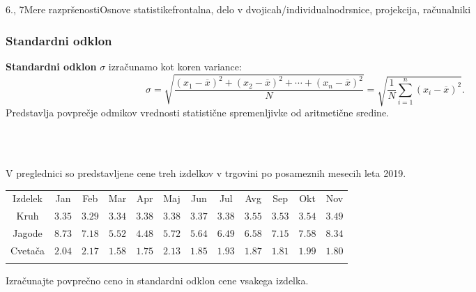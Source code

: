 \begin{priprava}{6., 7}{}{Mere razpršenosti}{Osnove statistike}{frontalna, delo v dvojicah/individualno}{drsnice, projekcija, računalniki}
% 
% 

\subsubsection{Standardni odklon}
    \textbf{Standardni odklon} $\sigma$ izračunamo kot koren variance:
    $$\sigma=\sqrt{\dfrac{(x_1-\overline{x})^2+(x_2-\overline{x})^2+\cdots+(x_n-\overline{x})^2}{N}}=\sqrt{\dfrac{1}{N}\sum_{i=1}^n(x_i-\overline{x})^2}.$$
    Predstavlja povprečje odmikov vrednosti statistične spremenljivke od aritmetične sredine.


~\\~




\begin{naloga}
 
    V preglednici so predstavljene cene treh izdelkov v trgovini po posameznih mesecih leta 2019. 

     \begin{table}[H]
         \centering
         \begin{tabular}{||c|c|c|c|c|c|c|c|c|c|c|c||} 
         \hhline{|t:============:t|}
         \rowcolor[rgb]{0.843,0.718,0.718} 
         Izdelek  & Jan & Feb & Mar & Apr & Maj & Jun & Jul & Avg & Sep & Okt & Nov    \\ 
         \hhline{|:============:|}
         Kruh  & $3.35$ & $3.29$ & $3.34$ & $3.38$ & $3.38$ & $3.37$ & $3.38$ & $3.55$ & $3.53$ & $3.54$ & $3.49$ \\ 
         \hhline{|:============:|}
         Jagode & $8.73$ & $7.18$ & $5.52$ & $4.48$ & $5.72$ & $5.64$ & $6.49$ & $6.58$ & $7.15$ & $7.58$ & $8.34$ \\ 
         \hhline{|:============:|}
         Cvetača & $2.04$ & $2.17$ & $1.58$ & $1.75$ & $2.13$ & $1.85$ & $1.93$ & $1.87$ & $1.81$ & $1.99$ & $1.80$ \\ 
         \hhline{|b:============:b|}
         \end{tabular}
     \end{table}

     Izračunajte povprečno ceno in standardni odklon cene vsakega izdelka.

 
    \end{naloga}





\begin{naloga}


\end{naloga}
\end{priprava}
